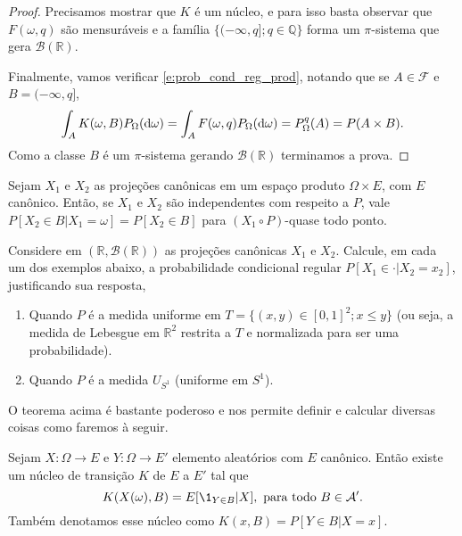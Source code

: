\begin{proof}
  Precisamos mostrar que $K$ é um núcleo, e para isso basta observar que $F(\omega, q)$ são mensuráveis e a família $\{(-\infty, q]; q \in \mathbb{Q}\}$ forma um $\pi$-sistema que gera $\mathcal{B}(\mathbb{R})$.

  Finalmente, vamos verificar \eqref{e:prob_cond_reg_prod}, notando que se $A \in \mathcal{F}$ e $B = (-\infty, q]$,
  \begin{equation}
    \int_A K(\omega, B) P_\Omega(\mathop{}\!\mathrm{d} \omega) = \int_A F(\omega, q) P_\Omega (\mathop{}\!\mathrm{d} \omega) = P^q_\Omega(A) = P(A \times B).
  \end{equation}
  Como a classe $B$ é um $\pi$-sistema gerando $\mathcal{B}(\mathbb{R})$ terminamos a prova.
\end{proof}

\begin{exercise}
  Sejam $X_1$ e $X_2$ as projeções canônicas em um espaço produto $\Omega \times E$, com $E$ canônico.
  Então, se $X_1$ e $X_2$ são independentes com respeito a $P$, vale $P[X_2 \in B | X_1 = \omega] = P[X_2 \in B]$ para $(X_1 \circ P)$-quase todo ponto.
\end{exercise}

\begin{exercise}
  Considere em $(\mathbb{R}, \mathcal{B}(\mathbb{R}))$ as projeções canônicas $X_1$ e $X_2$.
  Calcule, em cada um dos exemplos abaixo, a probabilidade condicional regular $P[X_1 \in \cdot|X_2 = x_2]$, justificando sua resposta,
  \begin{enumerate}[\quad a)]
  \item Quando $P$ é a medida uniforme em $T = \{(x,y) \in [0,1]^2; x \leq y\}$ (ou seja, a medida de Lebesgue em $\mathbb{R}^2$ restrita a $T$ e normalizada para ser uma probabilidade).
  \item Quando $P$ é a medida $U_{S^1}$ (uniforme em $S^1$).
  \end{enumerate}
\end{exercise}

O teorema acima é bastante poderoso e nos permite definir e calcular diversas coisas como faremos à seguir.

\begin{corollary}
  Sejam $X: \Omega \to E$ e $Y: \Omega \to E'$ elemento aleatórios com $E$ canônico.
  Então existe um núcleo de transição $K$ de $E$ a $E'$ tal que
  \begin{equation}
    \label{e:regular_cond_prob_givenX}
    K(X(\omega), B) = E[\1_{Y \in B} | X], \text{ para todo $B \in \mathcal{A}'$}.
  \end{equation}
  Também denotamos esse núcleo como $K(x, B) = P[Y \in B | X = x]$.
\end{corollary}

